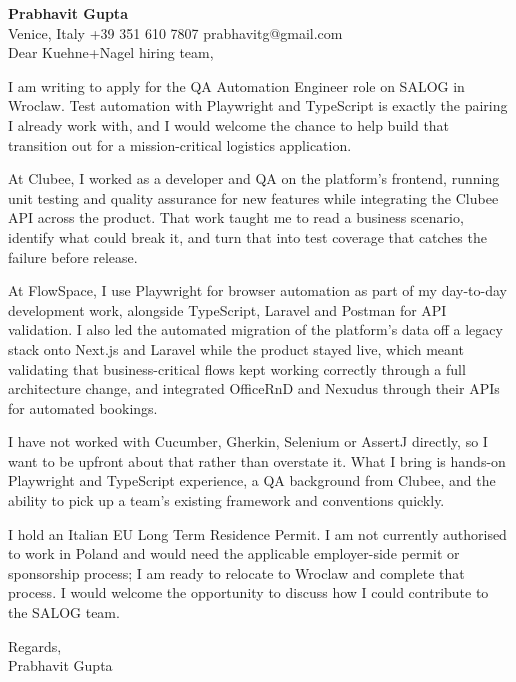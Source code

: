 \documentclass[a4paper,10.5pt]{article}
\begin{document}
\textbf{Prabhavit Gupta}\\
Venice, Italy \textbar{} +39 351 610 7807 \textbar{} prabhavitg@gmail.com\\[10pt]
Dear Kuehne+Nagel hiring team,

I am writing to apply for the QA Automation Engineer role on SALOG in Wroclaw. Test automation with Playwright and TypeScript is exactly the pairing I already work with, and I would welcome the chance to help build that transition out for a mission-critical logistics application.

At Clubee, I worked as a developer and QA on the platform's frontend, running unit testing and quality assurance for new features while integrating the Clubee API across the product. That work taught me to read a business scenario, identify what could break it, and turn that into test coverage that catches the failure before release.

At FlowSpace, I use Playwright for browser automation as part of my day-to-day development work, alongside TypeScript, Laravel and Postman for API validation. I also led the automated migration of the platform's data off a legacy stack onto Next.js and Laravel while the product stayed live, which meant validating that business-critical flows kept working correctly through a full architecture change, and integrated OfficeRnD and Nexudus through their APIs for automated bookings.

I have not worked with Cucumber, Gherkin, Selenium or AssertJ directly, so I want to be upfront about that rather than overstate it. What I bring is hands-on Playwright and TypeScript experience, a QA background from Clubee, and the ability to pick up a team's existing framework and conventions quickly.

I hold an Italian EU Long Term Residence Permit. I am not currently authorised to work in Poland and would need the applicable employer-side permit or sponsorship process; I am ready to relocate to Wroclaw and complete that process. I would welcome the opportunity to discuss how I could contribute to the SALOG team.

Regards,\\
Prabhavit Gupta
\end{document}
